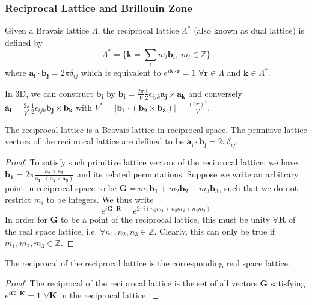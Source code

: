 \documentclass[a4paper]{article}
\begin{document}
\subsubsection*{Reciprocal Lattice and Brillouin Zone \cite{ashcroft1976solid}}
\begin{defi}
Given a Bravais lattice $\Lambda$, the reciprocal lattice $\Lambda^*$ (also known as dual lattice) is defined by
$$\Lambda^*=\bigg\{\mathbf{k}=\sum_lm_l\mathbf{b_l},~m_l\in\mathbb{Z}\bigg\}$$
where $\mathbf{a_i}\cdot\mathbf{b_j}=2\pi\delta_{ij}$ which is equivalent to $e^{i\mathbf{k}\cdot\mathbf{r}}=1$ $\forall\mathbf{r}\in\Lambda$ and $\mathbf{k}\in\Lambda^*$.
\end{defi}
In 3D, we can construct $\mathbf{b_i}$ by $\mathbf{b_i}=\frac{2\pi}{V}\frac{1}{2}\epsilon_{ijk}\mathbf{a_j}\times\mathbf{a_k}$ and conversely $\mathbf{a_i}=\frac{2\pi}{V^*}\frac{1}{2}\epsilon_{ijk}\mathbf{b_j}\times\mathbf{b_k}$ with $V^*=|\mathbf{b_1}\cdot(\mathbf{b_2}\times\mathbf{b_3})|=\frac{(2\pi)^3}{V}$.
\begin{thm}
The reciprocal lattice is a Bravais lattice in reciprocal space. The primitive lattice vectors of the reciprocal lattice are defined to be $\mathbf{a_i}\cdot\mathbf{b_j}=2\pi\delta_{ij}$.
\end{thm}
\begin{proof}
To satisfy such primitive lattice vectors of the reciprocal lattice, we have $\mathbf{b_1}= 2\pi\frac{\mathbf{a_2}\times\mathbf{a_3}}{\mathbf{a_1}\cdot(\mathbf{a_2}\times\mathbf{a_3})}$ and its related permutations. Suppose we write an arbitrary point in reciprocal space to be $\mathbf{G}=m_1\mathbf{b_1}+m_2\mathbf{b_2}+m_3\mathbf{b_3}$, such that we do not restrict $m_i$ to be integers. We thus write
$$e^{i\mathbf{G}\cdot\mathbf{R}}=e^{2\pi i(n_1m_1+n_2m_2+n_3m_3)}$$
In order for $\mathbf{G}$ to be a point of the reciprocal lattice, this must be unity $\forall\mathbf{R}$ of the real space lattice, i.e. $\forall n_1,n_2,n_3\in\mathbb{Z}$. Clearly, this can only be true if $m_1,m_2,m_3\in\mathbb{Z}$.
\end{proof}
\begin{cor}
The reciprocal of the reciprocal lattice is the corresponding real space lattice.
\end{cor}
\begin{proof}
The reciprocal of the reciprocal lattice is the set of all vectors $\mathbf{G}$ satisfying $e^{i\mathbf{G}\cdot\mathbf{K}}=1$ $\forall\mathbf{K}$ in the reciprocal lattice. 
\end{proof}
\end{document}
